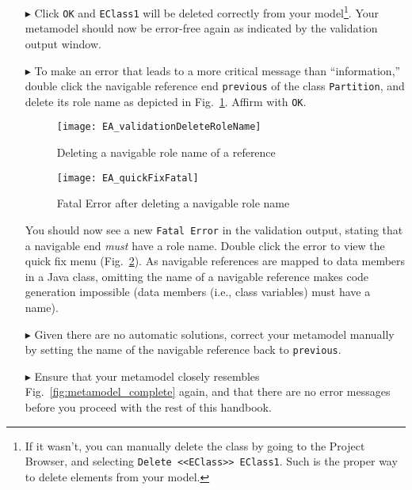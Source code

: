 \begin{enumerate}
\item[$\blacktriangleright$] Click \texttt{OK} and \texttt{EClass1} will be deleted correctly from your model\footnote{If it wasn't, you can manually delete the class by going to the Project Browser, and selecting \texttt{Delete <<EClass>> EClass1}. Such is the proper way to delete elements from your model.}.
Your metamodel should now be error-free again as indicated by the validation output window.

\item[$\blacktriangleright$] To make an error that leads to a more critical message than ``information,''
double click the navigable reference end \texttt{previous} of the class \texttt{Partition}, and delete its role name as depicted in Fig.~\ref{fig:delete-role-name}.
Affirm with \texttt{OK}.

\begin{figure}[htbp]
    \centering
  \texttt{[image: EA\_validationDeleteRoleName]}
    \caption{Deleting a navigable role name of a reference}
    \label{fig:delete-role-name}
\end{figure}


\begin{figure}[htbp]
	\centering
  \texttt{[image: EA\_quickFixFatal]}
	\caption{Fatal Error after deleting a navigable role name}
	\label{fig:fatal-error}
\end{figure}

You should now see a new \texttt{Fatal Error} in the validation output, stating that a navigable end \emph{must} have a role name. Double click the error to view the quick fix menu (Fig.~\ref{fig:fatal-error}). As navigable references are mapped to data members in a Java class, omitting the name of a navigable reference makes code generation impossible (data members (i.e., class variables) must have a name).

\item[$\blacktriangleright$] Given there are no automatic solutions, correct your metamodel manually by setting the name of the navigable reference back to \texttt{previous}.

\item[$\blacktriangleright$] Ensure that your metamodel closely resembles Fig.~\ref{fig:metamodel_complete} again, and that there are no error messages before you proceed with the rest of this handbook.
\end{enumerate}

